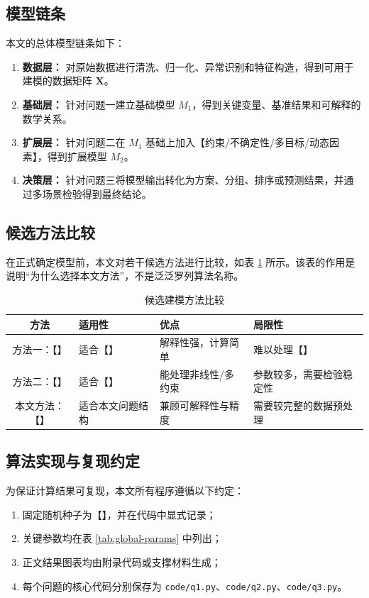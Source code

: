 \documentclass{cumcmthesis}
\begin{document}
\subsection{模型链条}
本文的总体模型链条如下：
\begin{enumerate}
  \item \textbf{数据层：} 对原始数据进行清洗、归一化、异常识别和特征构造，得到可用于建模的数据矩阵 $\mathbf{X}$。
  \item \textbf{基础层：} 针对问题一建立基础模型 $M_1$，得到关键变量、基准结果和可解释的数学关系。
  \item \textbf{扩展层：} 针对问题二在 $M_1$ 基础上加入【约束/不确定性/多目标/动态因素】，得到扩展模型 $M_2$。
  \item \textbf{决策层：} 针对问题三将模型输出转化为方案、分组、排序或预测结果，并通过多场景检验得到最终结论。
\end{enumerate}

\subsection{候选方法比较}
在正式确定模型前，本文对若干候选方法进行比较，如表 \ref{tab:method-compare} 所示。该表的作用是说明“为什么选择本文方法”，不是泛泛罗列算法名称。

\begin{table}[H]
  \centering
  \caption{候选建模方法比较}
  \label{tab:method-compare}
  \begin{tabularx}{0.95\textwidth}{cXXX}
    \toprule
    方法 & 适用性 & 优点 & 局限性 \\
    \midrule
    方法一：【】 & 适合【】 & 解释性强，计算简单 & 难以处理【】 \\
    方法二：【】 & 适合【】 & 能处理非线性/多约束 & 参数较多，需要检验稳定性 \\
    本文方法：【】 & 适合本文问题结构 & 兼顾可解释性与精度 & 需要较完整的数据预处理 \\
    \bottomrule
  \end{tabularx}
\end{table}

\subsection{算法实现与复现约定}
为保证计算结果可复现，本文所有程序遵循以下约定：
\begin{enumerate}
  \item 固定随机种子为【】，并在代码中显式记录；
  \item 关键参数均在表 \ref{tab:global-params} 中列出；
  \item 正文结果图表均由附录代码或支撑材料生成；
  \item 每个问题的核心代码分别保存为 \texttt{code/q1.py}、\texttt{code/q2.py}、\texttt{code/q3.py}。
\end{enumerate}
\end{document}
